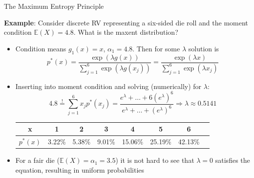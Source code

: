 \documentclass[11pt,compress,t,notes=noshow, xcolor=table]{beamer}
\begin{document}
\begin{vbframe}{The Maximum Entropy Principle}

\textbf{Example}: Consider discrete RV representing a six-sided die roll and the moment condition $\mathbb{E}(X)=4.8$. What is the maxent distribution?\\

\begin{itemize}
\setlength{\itemsep}{0.9em}
    \item Condition means $g_1(x)=x$, $\alpha_1=4.8$. Then for some $\lambda$ solution is
    {\small $$p^{\ast}(x)=\frac{\exp{(\lambda g(x))}}{\sum_{j=1}^{6} \exp({\lambda g(x_j)})} = \frac{\exp{(\lambda x)}}{\sum_{j=1}^{6} \exp{(\lambda x_j)}}$$}
    \item Inserting into moment condition and solving (numerically) for $\lambda$: 
    $$4.8\overset{!}{=}\sum_{j=1}^{6} x_j p^{\ast}(x_j) = \frac{e^\lambda+\ldots+6(e^\lambda)^6}{e^\lambda+\ldots+(e^{\lambda})^6} \Rightarrow \lambda \approx 0.5141$$
{\small
\begin{tabular}{|c|c|c|c|c|c|c|c}
\hline
x & 1 & 2 & 3 & 4 & 5 & 6 \\ 
\hline
$p^{\ast}(x)$ & 3.22\% & 5.38\% & 9.01\% & 15.06\% & 25.19\% & 42.13\%\\ 
\hline
\end{tabular}
}
\item For a fair die ($\mathbb{E}(X)=\alpha_1=3.5$) it is not hard to see that $\lambda=0$ satisfies the equation, resulting in uniform probabilities
\end{itemize}
\end{vbframe}



\endlecture
\end{document}
